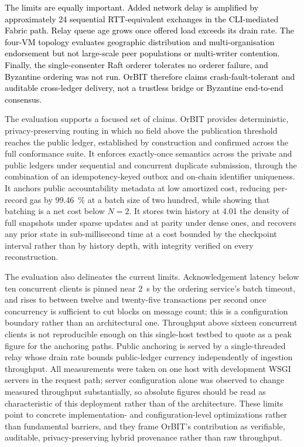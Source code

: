 \documentclass[final,5p,times,twocolumn]{elsarticle}
\begin{document}
\textcolor{black}{The limits are equally important. Added network delay is amplified by approximately 24 sequential RTT-equivalent exchanges in the CLI-mediated Fabric path. Relay queue age grows once offered load exceeds its drain rate. The four-VM topology evaluates geographic distribution and multi-organisation endorsement but not large-scale peer populations or multi-writer contention. Finally, the single-consenter Raft orderer tolerates no orderer failure, and Byzantine ordering was not run. OrBIT therefore claims crash-fault-tolerant and auditable cross-ledger delivery, not a trustless bridge or Byzantine end-to-end consensus.}

\iffalse

The evaluation supports a focused set of claims. OrBIT provides deterministic,
privacy-preserving routing in which no field above the publication threshold
reaches the public ledger, established by construction and confirmed across the
full conformance suite. It enforces exactly-once semantics across the private
and public ledgers under sequential and concurrent duplicate submission, through
the combination of an idempotency-keyed outbox and on-chain identifier
uniqueness. It anchors public accountability metadata at low amortized cost,
reducing per-record gas by \SI{99.46}{\percent} at a batch size of two hundred,
while showing that batching is a net cost below $N=2$. It stores twin history at
\SI{4.01}{\times} the density of full snapshots under sparse updates and at
parity under dense ones, and recovers any prior state in sub-millisecond time at
a cost bounded by the checkpoint interval rather than by history depth, with
integrity verified on every reconstruction.

The evaluation also delineates the current limits. Acknowledgement latency below
ten concurrent clients is pinned near \SI{2}{\second} by the ordering service's
batch timeout, and rises to between twelve and twenty-five transactions per
second once concurrency is sufficient to cut blocks on message count; this is a
configuration boundary rather than an architectural one. Throughput above
sixteen concurrent clients is not reproducible enough on this single-host
testbed to quote as a peak figure for the anchoring paths. Public anchoring is
served by a single-threaded relay whose drain rate bounds public-ledger currency
independently of ingestion throughput. All measurements were taken on one host
with development WSGI servers in the request path; server configuration alone
was observed to change measured throughput substantially, so absolute figures
should be read as characteristic of this deployment rather than of the
architecture. These limits point to concrete implementation- and
configuration-level optimizations rather than fundamental barriers, and they
frame OrBIT's contribution as verifiable, auditable, privacy-preserving hybrid
provenance rather than raw throughput.
\end{document}
